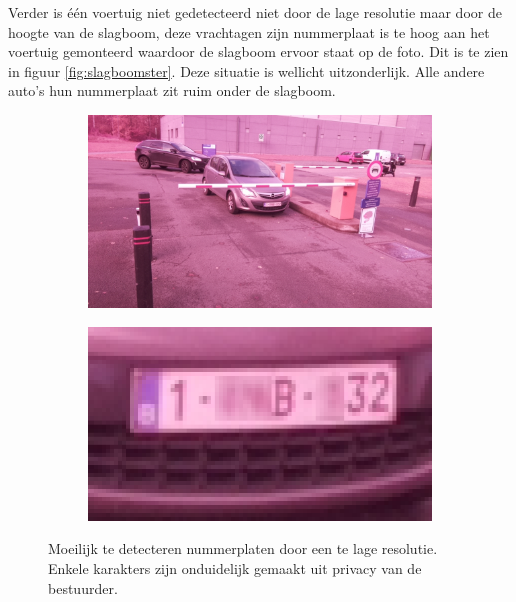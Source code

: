 Verder is één voertuig niet gedetecteerd niet door de lage resolutie maar door de hoogte van de slagboom, deze vrachtagen zijn nummerplaat is te hoog aan het voertuig gemonteerd waardoor de slagboom ervoor staat op de foto. Dit is te zien in figuur \ref{fig:slagboomster}. Deze situatie is wellicht uitzonderlijk. Alle andere auto's hun nummerplaat zit ruim onder de slagboom.

\begin{figure}[h!]
	\centering
	\begin{subfigure}[b]{0.49\linewidth}
		\includegraphics[width=\linewidth]{img/sterachter/sterachter1.jpg}
	\end{subfigure}
	\begin{subfigure}[b]{0.49\linewidth}
		\includegraphics[width=\linewidth]{img/sterachter/sterachter2.png}
	\end{subfigure}
	\caption{Moeilijk te detecteren nummerplaten door een te lage resolutie. Enkele karakters zijn onduidelijk gemaakt uit privacy van de bestuurder.}
	\label{fig:lowressterre}
\end{figure}

